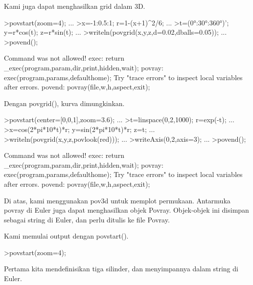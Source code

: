 \documentclass{article}
\begin{document}
\begin{eulernotebook}
\begin{eulercomment}
\begin{eulercomment}
\begin{eulercomment}
Kami juga dapat menghasilkan grid dalam 3D.
\end{eulercomment}
\begin{eulerprompt}
>povstart(zoom=4); ...
>x=-1:0.5:1; r=1-(x+1)^2/6; ...
>t=(0°:30°:360°)'; y=r*cos(t); z=r*sin(t); ...
>writeln(povgrid(x,y,z,d=0.02,dballs=0.05)); ...
>povend();
\end{eulerprompt}
\begin{euleroutput}
  Command was not allowed!
  exec:
      return _exec(program,param,dir,print,hidden,wait);
  povray:
      exec(program,params,defaulthome);
  Try "trace errors" to inspect local variables after errors.
  povend:
      povray(file,w,h,aspect,exit); 
\end{euleroutput}
\begin{eulercomment}
Dengan povgrid(), kurva dimungkinkan.
\end{eulercomment}
\begin{eulerprompt}
>povstart(center=[0,0,1],zoom=3.6); ...
>t=linspace(0,2,1000); r=exp(-t); ...
>x=cos(2*pi*10*t)*r; y=sin(2*pi*10*t)*r; z=t; ...
>writeln(povgrid(x,y,z,povlook(red))); ...
>writeAxis(0,2,axis=3); ...
>povend();
\end{eulerprompt}
\begin{euleroutput}
  Command was not allowed!
  exec:
      return _exec(program,param,dir,print,hidden,wait);
  povray:
      exec(program,params,defaulthome);
  Try "trace errors" to inspect local variables after errors.
  povend:
      povray(file,w,h,aspect,exit); 
\end{euleroutput}
\begin{eulercomment}
Di atas, kami menggunakan pov3d untuk memplot permukaan. Antarmuka
povray di Euler juga dapat menghasilkan objek Povray. Objek-objek ini
disimpan sebagai string di Euler, dan perlu ditulis ke file Povray.

Kami memulai output dengan povstart().
\end{eulercomment}
\begin{eulerprompt}
>povstart(zoom=4);
\end{eulerprompt}
\begin{eulercomment}
Pertama kita mendefinisikan tiga silinder, dan menyimpannya dalam
string di Euler.


\end{eulercomment}
\end{eulercomment}
\end{eulercomment}
\end{eulernotebook}
\end{document}

